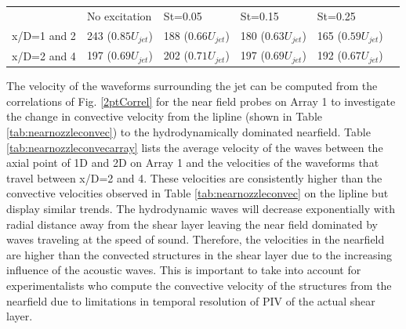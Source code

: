 \documentclass[english]{aiaa-tc}
\begin{document}
\begin{center}
	\begin{tabular}{|l|l|l|l|l|l}
		 & No excitation & St=0.05 & St=0.15 & St=0.25 \\
		x/D=1 and 2 & 243 ($0.85U_{jet}$) & 188 ($0.66U_{jet}$) & 180 ($0.63U_{jet}$) & 165 ($0.59U_{jet}$) \\
		x/D=2 and 4 & 197 ($0.69U_{jet}$) & 202 ($0.71U_{jet}$) & 197 ($0.69U_{jet}$) & 192 ($0.67U_{jet}$) \\
	\end{tabular}
	\label{tab:nearnozzleconvecarray}
\end{center}
The velocity of the waveforms surrounding the jet can be computed from the correlations of Fig. \ref{2ptCorrel} for the near field probes on Array 1 to investigate the change in convective velocity from the lipline (shown in Table \ref{tab:nearnozzleconvec}) to the hydrodynamically dominated nearfield. Table \ref{tab:nearnozzleconvecarray} lists the average velocity of the waves between the axial point of 1D and 2D on Array 1 and the velocities of the waveforms that travel between x/D=2 and 4. These velocities are consistently higher than the convective velocities observed in Table \ref{tab:nearnozzleconvec} on the lipline but display similar trends. The hydrodynamic waves will decrease exponentially with radial distance away from the shear layer leaving the near field dominated by waves traveling at the speed of sound. Therefore, the velocities in the nearfield are higher than the convected structures in the shear layer due to the increasing influence of the acoustic waves. This is important to take into account for experimentalists who compute the convective velocity of the structures from the nearfield due to limitations in temporal resolution of PIV of the actual shear layer.

\end{document}
